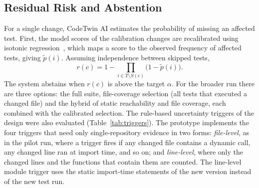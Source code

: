 \documentclass[conference]{IEEEtran}
\begin{document}
\subsection{Residual Risk and Abstention}\label{sec:risk}
For a single change, CodeTwin AI estimates the probability of missing an affected test. First, the model scores of the calibration changes are recalibrated using isotonic regression~\cite{zadrozny2002calibration}, which maps a score to the observed frequency of affected tests, giving $\tilde p(i)$. Assuming independence between skipped tests,
\begin{equation}
r(c) = 1 - \textstyle\prod_{i \in T\setminus S(c)} \big(1-\tilde p(i)\big). \label{eq:rc}
\end{equation}
The system abstains when $r(c)$ is above the target $\alpha$. For the broader run there are three options: the full suite, file-coverage selection (all tests that executed a changed file) and the hybrid of static reachability and file coverage, each combined with the calibrated selection. The rule-based uncertainty triggers of the design were also evaluated (Table~\ref{tab:triggers}). The prototype implements the four triggers that need only single-repository evidence in two forms: \emph{file-level}, as in the pilot run, where a trigger fires if any changed file contains a dynamic call, any changed line ran at import time, and so on; and \emph{line-level}, where only the changed lines and the functions that contain them are counted. The line-level module trigger uses the static import-time statements of the new version instead of the new test run.
\end{document}

